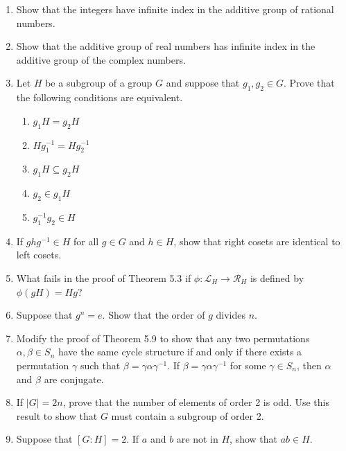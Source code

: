 {\begin{enumerate}
\item
Show that the integers have infinite index in the additive group of rational numbers.
 
\item
Show that the additive group of real numbers has infinite index in the additive group of the complex numbers.
 
\item
Let $H$ be a subgroup of a group $G$ and suppose that $g_1, g_2 \in G$.  Prove that the following conditions are equivalent.
\begin{enumerate}
 
\item
$g_1 H = g_2 H$
 
\item
$H g_1^{-1}  = H g_2^{-1}$
 
\item
$g_1 H \subseteq g_2 H$
 
\item
$g_2 \in g_1 H$
 
\item
$g_1^{-1} g_2 \in H$
 
\end{enumerate}
 
\item
If $ghg^{-1} \in H$ for all $g \in G$ and $h \in H$, show that right cosets are identical to left cosets.
 
\item
What fails in the proof of Theorem 5.3 if $\phi :  {\mathcal L}_H \rightarrow {\mathcal R}_H$ is defined by $\phi( gH ) = Hg$?
 
\item
Suppose that $g^n = e$. Show that the order of $g$ divides
$n$.
 
\item
Modify the proof of Theorem 5.9 to show that any two permutations $\alpha, \beta \in S_n$ have the same cycle structure if and only if there exists a  permutation $\gamma$ such that $\beta = \gamma \alpha \gamma^{-1}$.  If $\beta = \gamma \alpha \gamma^{-1}$ for some $\gamma \in S_n$, then $\alpha$ and $\beta$ are {\bfi conjugate}.

\item
If $|G| = 2n$, prove that the number of elements of order 2 is odd.  Use this result to show that $G$ must contain a subgroup of order 2.

\item
Suppose that $[G : H] = 2$. If $a$ and $b$ are not in $H$, show that $ab \in H$.


\end{enumerate}}
